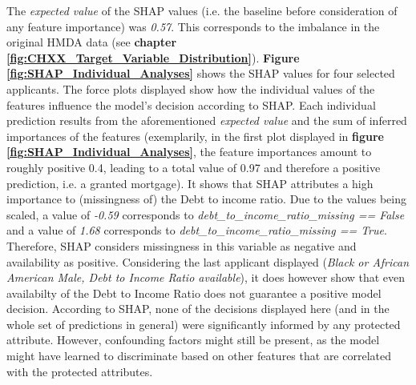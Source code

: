 The \textit{expected value} of the SHAP values (i.e. the baseline before consideration of any feature importance) was \textit{0.57}. This corresponds to the imbalance in the original HMDA data (see \textbf{chapter \ref{fig:CHXX_Target_Variable_Distribution}}).
\textbf{Figure \ref{fig:SHAP_Individual_Analyses}} shows the SHAP values for four selected applicants. The force plots displayed show how the individual values of the features influence the model's decision according to SHAP. 
Each individual prediction results from the aforementioned \textit{expected value} and the sum of inferred importances of the features (exemplarily, in the first plot displayed in \textbf{figure \ref{fig:SHAP_Individual_Analyses}}, the feature importances amount to roughly positive 0.4, leading to a total value of 0.97 and therefore a positive prediction, i.e. a granted mortgage).
It shows that SHAP attributes a high importance to (missingness of) the Debt to income ratio. Due to the values being scaled, a value of \textit{-0.59} corresponds to \textit{debt\_to\_income\_ratio\_missing == False} and a value of \textit{1.68} corresponds to \textit{debt\_to\_income\_ratio\_missing == True}. Therefore, SHAP considers missingness in this variable as negative and availability as positive.
Considering the last applicant displayed (\textit{Black or African American Male, Debt to Income Ratio available}), it does however show that even availabilty of the Debt to Income Ratio does not guarantee a positive model decision.
According to SHAP, none of the decisions displayed here (and in the whole set of predictions in general) were significantly informed by any protected attribute. However, confounding factors might still be present, as the model might have learned to discriminate based on other features that are correlated with the protected attributes.

